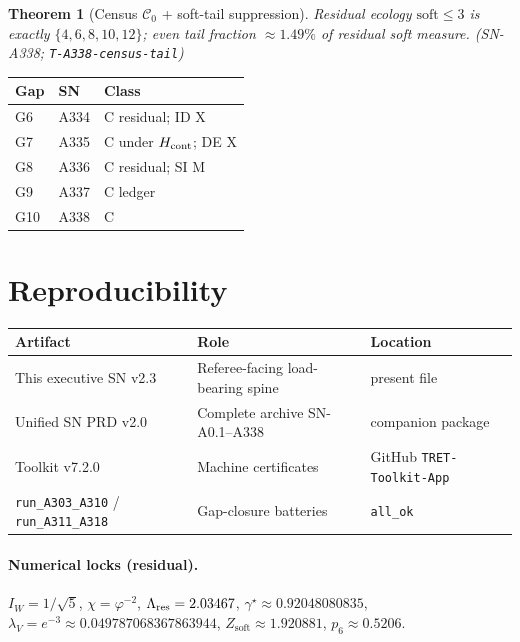 \documentclass[11pt,a4paper]{article}
\newtheorem{theorem}{Theorem}
\theoremstyle{remark}
\begin{document}
\begin{theorem}[Census $\mathcal{C}_0$ + soft-tail suppression]
Residual ecology $\mathrm{soft}\le 3$ is exactly $\{4,6,8,10,12\}$; even tail fraction $\approx 1.49\%$ of residual soft measure. (SN-A338; \texttt{T-A338-census-tail})
\end{theorem}

\begin{center}
\begin{tabular}{@{}llp{5.5cm}@{}}
\toprule
Gap & SN & Class \\
\midrule
G6 & A334 & C residual; ID X \\
G7 & A335 & C under $H_{\rm cont}$; DE X \\
G8 & A336 & C residual; SI M \\
G9 & A337 & C ledger \\
G10 & A338 & C \\
\bottomrule
\end{tabular}
\end{center}

\section{Reproducibility}
\label{sec:repro}

\begin{center}
\begin{tabular}{@{}llp{5.5cm}@{}}
\toprule
\textbf{Artifact} & \textbf{Role} & \textbf{Location} \\
\midrule
This executive SN v2.3 & Referee-facing load-bearing spine & present file \\
Unified SN PRD v2.0 & Complete archive SN-A0.1--A338 & companion package \\
Toolkit v7.2.0 & Machine certificates & GitHub \texttt{TRET-Toolkit-App} \\
\texttt{run\_A303\_A310} / \texttt{run\_A311\_A318} & Gap-closure batteries & \texttt{all\_ok} \\
\bottomrule
\end{tabular}
\end{center}

\paragraph{Numerical locks (residual).}
$I_W=1/\sqrt{5}$, $\chi=\varphi^{-2}$, $\Lambda_{\rm res}=2.03467$, $\gamma^\star\approx 0.92048080835$, $\lambda_V=e^{-3}\approx 0.049787068367863944$, $Z_{\mathrm{soft}}\approx 1.920881$, $p_6\approx 0.5206$.
\end{document}
